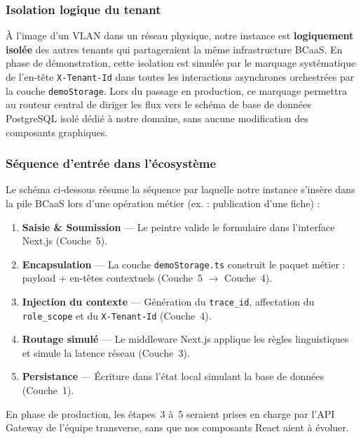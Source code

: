 \documentclass[12pt,a4paper]{report}
\begin{document}
\subsubsection{Isolation logique du tenant}

À l'image d'un VLAN dans un réseau physique, notre instance est \textbf{logiquement isolée} des autres tenants qui partageraient la même infrastructure BCaaS. En phase de démonstration, cette isolation est simulée par le marquage systématique de l'en-tête \texttt{X-Tenant-Id} dans toutes les interactions asynchrones orchestrées par la couche \texttt{demoStorage}. Lors du passage en production, ce marquage permettra au routeur central de diriger les flux vers le schéma de base de données PostgreSQL isolé dédié à notre domaine, sans aucune modification des composants graphiques.

\subsubsection{Séquence d'entrée dans l'écosystème}

Le schéma ci-dessous résume la séquence par laquelle notre instance s'insère dans la pile BCaaS lors d'une opération métier (ex. : publication d'une fiche) :

\begin{enumerate}
    \item \textbf{Saisie \& Soumission} --- Le peintre valide le formulaire dans l'interface Next.js (Couche~5).
    \item \textbf{Encapsulation} --- La couche \texttt{demoStorage.ts} construit le paquet métier : payload + en-têtes contextuels (Couche~5 $\rightarrow$ Couche~4).
    \item \textbf{Injection du contexte} --- Génération du \texttt{trace\_id}, affectation du \texttt{role\_scope} et du \texttt{X-Tenant-Id} (Couche~4).
    \item \textbf{Routage simulé} --- Le middleware Next.js applique les règles linguistiques et simule la latence réseau (Couche~3).
    \item \textbf{Persistance} --- Écriture dans l'état local simulant la base de données (Couche~1).
\end{enumerate}

En phase de production, les étapes~3 à~5 seraient prises en charge par l'API Gateway de l'équipe transverse, sans que nos composants React aient à évoluer.
\end{document}
